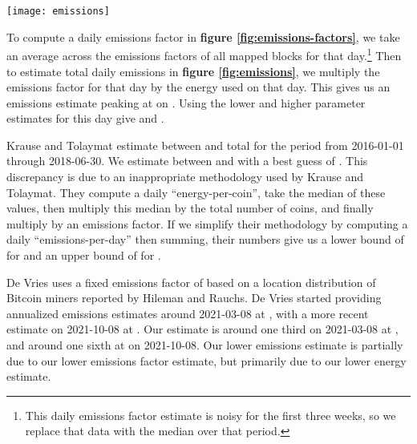 \begin{figure*}[htp]
    \centering
    \texttt{[image: emissions]}
    \caption{Ethereum emissions in \SI{}{\kilo\ton\COtwo\per{day}} and equivalent annualized \SI{}{\mega\ton\COtwo\per{year}} based on energy usage, block metadata, and regional emissions factors. Shaded region shows the range between our lower and upper estimates.}
    \label{fig:emissions}
\end{figure*}

To compute a daily emissions factor in \textbf{figure \ref{fig:emissions-factors}}, we take an average across the emissions factors of all mapped blocks for that day.\footnote{This daily emissions factor estimate is noisy for the first three weeks, so we replace that data with the median over that period.} Then to estimate total daily emissions in \textbf{figure \ref{fig:emissions}}, we multiply the emissions factor for that day by the energy used on that day. This gives us an emissions estimate peaking at  on . Using the lower and higher parameter estimates for this day give  and .

Krause and Tolaymat estimate between  and  total for the period from 2016-01-01 through 2018-06-30. We estimate between  and  with a best guess of . This discrepancy is due to an inappropriate methodology used by Krause and Tolaymat. They compute a daily ``energy-per-coin'', take the median of these values, then multiply this median by the total number of coins, and finally multiply by an emissions factor. If we simplify their methodology by computing a daily ``emissions-per-day'' then summing, their numbers give us a lower bound of  for  and an upper bound of  for .

De Vries uses a fixed emissions factor of  based on a location distribution of Bitcoin miners reported by Hileman and Rauchs\cite{hileman_2017_2017}. De Vries started providing annualized emissions estimates around 2021-03-08 at , with a more recent estimate on 2021-10-08 at . Our estimate is around one third on 2021-03-08 at , and around one sixth at  on 2021-10-08. Our lower emissions estimate is partially due to our lower emissions factor estimate, but primarily due to our lower energy estimate.

